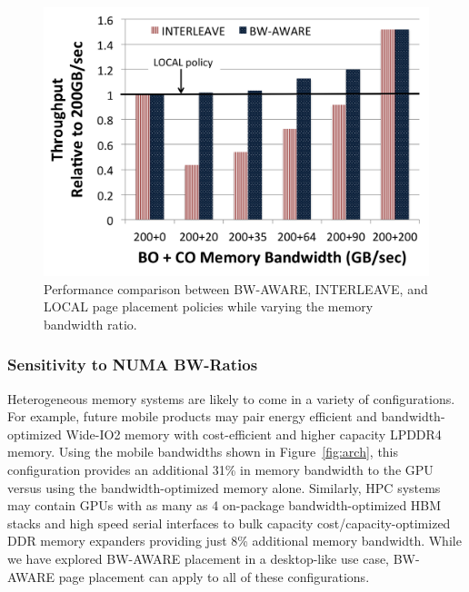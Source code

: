 \begin{figure}[t]
    \includegraphics[width=\columnwidth]{asplos2015/figures/sensitivitytobwratio.png}
    \caption{Performance comparison between BW-AWARE, INTERLEAVE, and LOCAL page placement
policies while varying the memory bandwidth ratio.}
    \label{fig:sensitivitytobwratio}
\end{figure}

\subsubsection{Sensitivity to NUMA BW-Ratios\\} 
Heterogeneous memory systems are likely to come in a variety of configurations.
For example, future mobile products may pair energy efficient
and bandwidth-optimized Wide-IO2 memory with cost-efficient and higher capacity
LPDDR4 memory.  Using the mobile bandwidths shown in Figure~\ref{fig:arch},
{\color{black}this configuration} provides
an additional 31\% in memory bandwidth to the GPU versus using the bandwidth-optimized memory alone. 
Similarly, HPC systems may contain GPUs with as many as 4 on-package
bandwidth-optimized HBM stacks and 
high speed serial interfaces to bulk capacity cost/capacity-optimized DDR memory expanders
providing just 8\% additional memory bandwidth.  While we have explored BW-AWARE
placement in a desktop-like use case, BW-AWARE page placement can apply 
to all of these configurations.  

